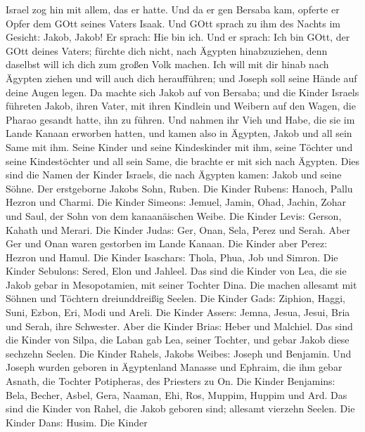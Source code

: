  Israel zog hin mit allem, das er hatte. Und da er gen
Bersaba kam, opferte er Opfer dem GOtt seines Vaters Isaak. 
Und GOtt sprach zu ihm des Nachts im Gesicht: Jakob, Jakob! Er sprach:
Hie bin ich.  Und er sprach: Ich bin GOtt, der GOtt deines
Vaters; fürchte dich nicht, nach Ägypten hinabzuziehen, denn daselbst
will ich dich zum großen Volk machen.  Ich will mit dir
hinab nach Ägypten ziehen und will auch dich heraufführen; und Joseph
soll seine Hände auf deine Augen legen.  Da machte sich
Jakob auf von Bersaba; und die Kinder Israels führeten Jakob, ihren
Vater, mit ihren Kindlein und Weibern auf den Wagen, die Pharao gesandt
hatte, ihn zu führen.  Und nahmen ihr Vieh und Habe, die sie
im Lande Kanaan erworben hatten, und kamen also in Ägypten, Jakob und
all sein Same mit ihm.  Seine Kinder und seine Kindeskinder
mit ihm, seine Töchter und seine Kindestöchter und all sein Same, die
brachte er mit sich nach Ägypten.  Dies sind die Namen der
Kinder Israels, die nach Ägypten kamen: Jakob und seine Söhne. Der
erstgeborne Jakobs Sohn, Ruben.  Die Kinder Rubens: Hanoch,
Pallu Hezron und Charmi.  Die Kinder Simeons: Jemuel,
Jamin, Ohad, Jachin, Zohar und Saul, der Sohn von dem kanaanäischen
Weibe.  Die Kinder Levis: Gerson, Kahath und Merari.
 Die Kinder Judas: Ger, Onan, Sela, Perez und Serah. Aber
Ger und Onan waren gestorben im Lande Kanaan. Die Kinder aber Perez:
Hezron und Hamul.  Die Kinder Isaschars: Thola, Phua, Job
und Simron.  Die Kinder Sebulons: Sered, Elon und Jahleel.
 Das sind die Kinder von Lea, die sie Jakob gebar in
Mesopotamien, mit seiner Tochter Dina. Die machen allesamt mit Söhnen
und Töchtern dreiunddreißig Seelen.  Die Kinder Gads:
Ziphion, Haggi, Suni, Ezbon, Eri, Modi und Areli.  Die
Kinder Assers: Jemna, Jesua, Jesui, Bria und Serah, ihre Schwester. Aber
die Kinder Brias: Heber und Malchiel.  Das sind die Kinder
von Silpa, die Laban gab Lea, seiner Tochter, und gebar Jakob diese
sechzehn Seelen.  Die Kinder Rahels, Jakobs Weibes: Joseph
und Benjamin.  Und Joseph wurden geboren in Ägyptenland
Manasse und Ephraim, die ihm gebar Asnath, die Tochter Potipheras, des
Priesters zu On.  Die Kinder Benjamins: Bela, Becher,
Asbel, Gera, Naaman, Ehi, Ros, Muppim, Huppim und Ard.  Das
sind die Kinder von Rahel, die Jakob geboren sind; allesamt vierzehn
Seelen.  Die Kinder Dans: Husim.  Die Kinder
